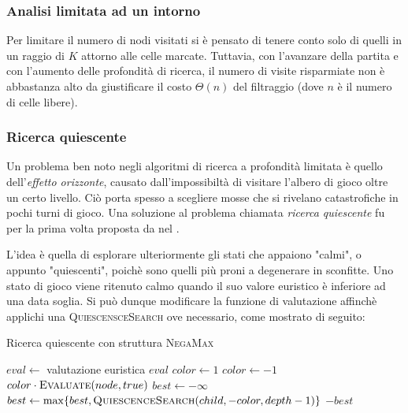\documentclass{article}
\begin{document}

\subsubsection{Analisi limitata ad un intorno}

Per limitare il numero di nodi visitati si \`e pensato di tenere conto solo di
quelli in un raggio di $K$ attorno alle celle marcate. Tuttavia, con l'avanzare
della partita e con l'aumento delle profondit\`a di ricerca, il numero di visite
risparmiate non \`e abbastanza alto da giustificare il costo $\Theta(n)$ del
filtraggio (dove $n$ \`e il numero di celle libere).

\subsubsection{Ricerca quiescente}

Un problema ben noto negli algoritmi di ricerca a profondit\`a limitata \`e
quello dell'\emph{effetto orizzonte}, causato dall'impossibilt\`a 
di visitare l'albero di gioco oltre un certo livello. Ci\`o porta spesso a scegliere 
mosse che si rivelano catastrofiche in pochi turni di gioco. 
Una soluzione al problema chiamata \emph{ricerca quiescente} \cite{quiescence} fu per la prima
volta proposta  da \citeauthor{quiescence} nel \citeyear{quiescence}.

L'idea \`e quella di esplorare ulteriormente gli stati che appaiono "calmi", o
appunto "quiescenti", poich\`e sono quelli pi\`u proni a degenerare in sconfitte.
Uno stato di gioco viene ritenuto calmo quando il suo valore euristico \`e inferiore
ad una data soglia. Si pu\`o dunque modificare la funzione di valutazione affinch\`e
applichi una \textsc{QuiescensceSearch} ove necessario, come mostrato di seguito:

\begin{algorithm}[H]
  \caption{Ricerca quiescente con struttura \textsc{NegaMax}}
  \label{qs}
  \begin{algorithmic}[0]
      \State $eval \gets $ valutazione euristica
        \State \Return $eval$
      \Else
        \State $color \gets 1$
          \State $color \gets -1$
        \EndIf
        \State \Return {}
      \EndIf
    \EndProcedure
    \Statex
      \State \Return $color \cdot \Call{Evaluate}{node, true}$
    \EndIf
    \State $best \gets -\infty$
      \State $best \gets \max\{best, \Call{QuiescenceSearch}{child, -color, depth-1}\}$
    \EndFor
    \State \Return $-best$
    \EndProcedure
  \end{algorithmic}
\end{algorithm}
\end{document}
